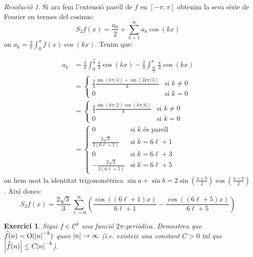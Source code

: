 \documentclass[10pt,a4paper]{article}
\renewcommand{\O}{\mathrm{O}} %
\newtheorem{exercici}{Exercici}
\theoremstyle{definition}
\theoremstyle{remark}
\newtheorem*{res}{Resolució}
\begin{document}
\begin{res}
  Si ara fem l'extensió parell de $f$ en $[-\pi,\pi]$ obtenim la seva sèrie de Fourier en termes del cosinus:
  \begin{equation}\label{cosinus}
    S_2f(x)=\frac{a_0}{2}+\sum_{k=1}^{\infty}a_k\cos(kx)
  \end{equation}
  on $a_k=\frac{2}{\pi}\int_0^\pi f(x)\cos(kx)$.
  Tenim que:

  \begin{align*}
    a_k & =\frac{2}{\pi}\int_0^{\frac{\pi}{3}} \frac{\pi}{3}\cos(kx)-\frac{2}{\pi}\int_{\frac{2\pi}{3}}^{\pi} \frac{\pi}{3}\cos(kx) \\
        & =\begin{cases}
             \frac{2}{3}\frac{\sin(k\pi/3)+\sin(2k\pi/3)}{k} & \text{si $k\ne 0$} \\
             0                                               & \text{si $k=0$}
           \end{cases}                                                     \\
        & =\begin{cases}
             \frac{4}{3}\frac{\sin(k\pi/2)\cos(k\pi/6)}{k} & \text{si $k\ne 0$} \\
             0                                             & \text{si $k=0$}
           \end{cases}                                                       \\
        & =\begin{cases}
             0                                          & \text{si $k$ és parell} \\
             \displaystyle\frac{2\sqrt{3}}{3(6\ell +1)} & \text{si $k=6\ell+1$}   \\
             0                                          & \text{si $k=6\ell + 3$} \\
             \displaystyle-\frac{2\sqrt{3}}{3(6\ell+5)} & \text{si $k=6\ell + 5$}
           \end{cases}
  \end{align*}
  on hem usat la identitat trigonomètrica $\sin a+\sin b=2\sin\left(\frac{a+b}{2}\right)\cos\left(\frac{a-b}{2}\right)$.
  Així doncs:
  $$S_2f(x)=\frac{2\sqrt{3}}{3}\sum_{\ell = 0}^\infty\left(\frac{\cos((6\ell + 1)x)}{6\ell + 1} - \frac{\cos((6\ell + 5)x)}{6\ell + 5}\right)$$
\end{res}
\begin{exercici}
  Sigui $f \in\mathcal{C}^k$ una funció $2\pi$-periòdica. Demostreu que $\widehat{f}(n)=\O(\abs{n}^{-k})$ quan $\abs{n}\to\infty$ (i.e. existeix una constant $C > 0$ tal que $\abs{\widehat{f}(n)}\leq C\abs{n}^{-k}$).
\end{exercici}
\end{document}
